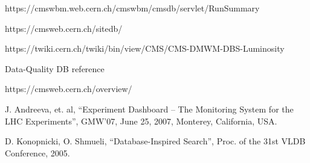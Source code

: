 \documentclass[a4paper]{jpconf}
\begin{document}
\begin{thebibliography}{9}
https://cmswbm.web.cern.ch/cmswbm/cmsdb/servlet/RunSummary

https://cmsweb.cern.ch/sitedb/

https://twiki.cern.ch/twiki/bin/view/CMS/CMS-DMWM-DBS-Luminosity

Data-Quality DB reference

https://cmsweb.cern.ch/overview/

J. Andreeva, et. al,
``Experiment Dashboard – The Monitoring System for the LHC Experiments'',
GMW’07, June 25, 2007, Monterey, California, USA.

D. Konopnicki, O. Shmueli,
``Database-Inspired Search'', 
Proc. of the 31st VLDB Conference, 2005.
\end{thebibliography}
\end{document}
